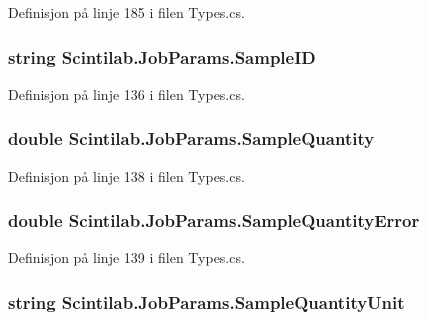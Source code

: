 Definisjon på linje 185 i filen Types.\+cs.

\hypertarget{class_scintilab_1_1_job_params_ad917381dddc28b41efe009a93a6cff75}{
\subsubsection[{Sample\+I\+D}]{\setlength{\rightskip}{0pt plus 5cm}string Scintilab.\+Job\+Params.\+Sample\+I\+D}}\label{class_scintilab_1_1_job_params_ad917381dddc28b41efe009a93a6cff75}


Definisjon på linje 136 i filen Types.\+cs.

\hypertarget{class_scintilab_1_1_job_params_a22bf6144ff75386c53afa155261cc777}{
\subsubsection[{Sample\+Quantity}]{\setlength{\rightskip}{0pt plus 5cm}double Scintilab.\+Job\+Params.\+Sample\+Quantity}}\label{class_scintilab_1_1_job_params_a22bf6144ff75386c53afa155261cc777}


Definisjon på linje 138 i filen Types.\+cs.

\hypertarget{class_scintilab_1_1_job_params_ac3a995d441ec029ac47cd763e42b44c1}{
\subsubsection[{Sample\+Quantity\+Error}]{\setlength{\rightskip}{0pt plus 5cm}double Scintilab.\+Job\+Params.\+Sample\+Quantity\+Error}}\label{class_scintilab_1_1_job_params_ac3a995d441ec029ac47cd763e42b44c1}


Definisjon på linje 139 i filen Types.\+cs.

\hypertarget{class_scintilab_1_1_job_params_a597f6b8466239ed6d4f3b490c48b7fc9}{
\subsubsection[{Sample\+Quantity\+Unit}]{\setlength{\rightskip}{0pt plus 5cm}string Scintilab.\+Job\+Params.\+Sample\+Quantity\+Unit}}\label{class_scintilab_1_1_job_params_a597f6b8466239ed6d4f3b490c48b7fc9}



